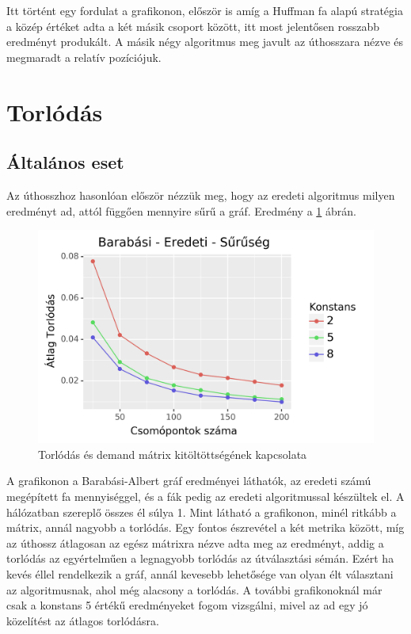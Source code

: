 \documentclass[12pt]{report}
\begin{document}
Itt történt egy fordulat a grafikonon, először is amíg a Huffman fa alapú stratégia a közép értéket adta a két másik csoport között, itt most jelentősen rosszabb eredményt produkált.
A másik négy algoritmus meg javult az úthosszara nézve és megmaradt a relatív pozíciójuk.

\section{Torlódás}

\subsection{Általános eset}

Az úthosszhoz hasonlóan először nézzük meg, hogy az eredeti algoritmus milyen eredményt ad, attól függően mennyire sűrű a gráf.
Eredmény a \ref{density-con} ábrán.

\begin{figure}[H]
	\begin{center}
		\includegraphics[width=0.9\linewidth]{pictures/density_con.png}
		\caption{Torlódás és demand mátrix kitöltöttségének kapcsolata }
		\label{density-con}
	\end{center}
\end{figure}

\pagebreak

A grafikonon a Barabási-Albert gráf eredményei láthatók, az eredeti számú megépített fa mennyiséggel, és a fák pedig az eredeti algoritmussal készültek el.
A hálózatban szereplő összes él súlya 1.
Mint látható a grafikonon, minél ritkább a mátrix, annál nagyobb a torlódás. 
Egy fontos észrevétel a két metrika között, míg az úthossz átlagosan az egész mátrixra nézve adta meg az eredményt, addig a torlódás az egyértelműen a legnagyobb torlódás az útválasztási sémán.
Ezért ha kevés éllel rendelkezik a gráf, annál kevesebb lehetősége van olyan élt választani az algoritmusnak, ahol még alacsony a torlódás.
A további grafikonoknál már csak a konstans 5 értékű eredményeket fogom vizsgálni, mivel az ad egy jó közelítést az átlagos torlódásra.
\end{document}
